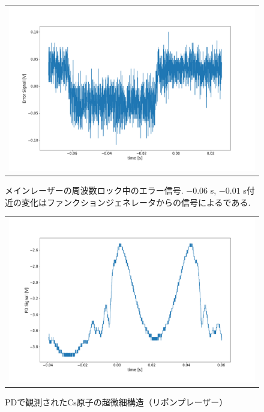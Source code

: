 \documentclass[uplatex, dvipdfmx, a4paper, report, papersize, 11pt]{jsbook}
\begin{document}
\begin{figure}[htpb]
\begin{tabular}{c}
      \begin{minipage}{1\hsize}
        \centering
          \includegraphics[keepaspectratio,  scale=0.25,  angle=0]
                          {figures/saturated-absorption/main-locking-error.png}
                          \caption{メインレーザーの周波数ロック中のエラー信号. $-0.06$ s, $-0.01$ s付近の変化はファンクションジェネレータからの信号によるである. }
                          \label{main-locking-error}
      \end{minipage}
    \end{tabular}
\end{figure}

\newpage
\begin{figure}[htpb]
  \centering
    \begin{tabular}{c}
      \begin{minipage}{1\hsize}
        \centering
          \includegraphics[keepaspectratio,  scale=0.35,  angle=0]
                          {figures/saturated-absorption/Repump_PD_signal.png}
                          \caption{PDで観測されたCs原子の超微細構造（リポンプレーザー）}
                          \label{Repump_PD_signal}
      \end{minipage}
    \end{tabular}
\end{figure}
\end{document}
